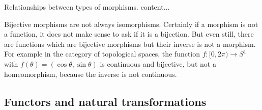 \begin{roadmap}{Relationships between types of morphisms.}
	content...
\end{roadmap}




\begin{warningbox}{Bijective morphisms are not always isomorphisms.}
	Certainly if a morphism is not a function, it does not make sense to ask if it is a bijection. But even still, there are functions which are bijective morphisms but their inverse is not a morphism. For example in the category of topological spaces, the function $f: [0, 2\pi) \to S^1$ with $f(\theta) = (\cos \theta, \sin \theta)$ is continuous and bijective, but not a homeomorphism, because the inverse is not continuous.
\end{warningbox}






\subsection{Functors and natural transformations}